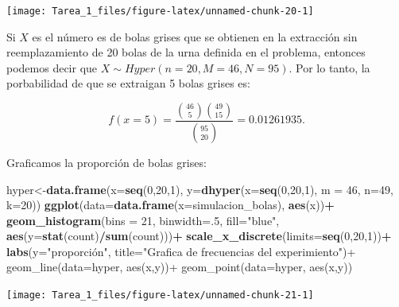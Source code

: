\documentclass[11pt,]{article}
\newenvironment{Shaded}{\begin{snugshade}}{\end{snugshade}}
\newcommand{\DataTypeTok}[1]{\textcolor[rgb]{0.13,0.29,0.53}{#1}}
\newcommand{\DecValTok}[1]{\textcolor[rgb]{0.00,0.00,0.81}{#1}}
\newcommand{\KeywordTok}[1]{\textcolor[rgb]{0.13,0.29,0.53}{\textbf{#1}}}
\newcommand{\NormalTok}[1]{#1}
\newcommand{\OperatorTok}[1]{\textcolor[rgb]{0.81,0.36,0.00}{\textbf{#1}}}
\newcommand{\StringTok}[1]{\textcolor[rgb]{0.31,0.60,0.02}{#1}}
\begin{document}
\begin{center}\texttt{[image: Tarea\_1\_files/figure-latex/unnamed-chunk-20-1]} \end{center}

Si \(X\) es el número es de bolas grises que se obtienen en la
extracción sin reemplazamiento de 20 bolas de la urna definida en el
problema, entonces podemos decir que \(X\sim Hyper(n=20, M=46, N=95)\).
Por lo tanto, la porbabilidad de que se extraigan 5 bolas grises es:

\[f(x=5)=\frac{{46 \choose 5}{49 \choose 15}}{{95 \choose 20}}=0.01261935. \]

Graficamos la proporción de bolas grises:

\begin{Shaded}
\begin{Highlighting}[]
\NormalTok{hyper<-}\KeywordTok{data.frame}\NormalTok{(}\DataTypeTok{x=}\KeywordTok{seq}\NormalTok{(}\DecValTok{0}\NormalTok{,}\DecValTok{20}\NormalTok{,}\DecValTok{1}\NormalTok{), }\DataTypeTok{y=}\KeywordTok{dhyper}\NormalTok{(}\DataTypeTok{x=}\KeywordTok{seq}\NormalTok{(}\DecValTok{0}\NormalTok{,}\DecValTok{20}\NormalTok{,}\DecValTok{1}\NormalTok{), }\DataTypeTok{m =} \DecValTok{46}\NormalTok{, }\DataTypeTok{n=}\DecValTok{49}\NormalTok{, }\DataTypeTok{k=}\DecValTok{20}\NormalTok{))}
\KeywordTok{ggplot}\NormalTok{(}\DataTypeTok{data=}\KeywordTok{data.frame}\NormalTok{(}\DataTypeTok{x=}\NormalTok{simulacion_bolas), }\KeywordTok{aes}\NormalTok{(x))}\OperatorTok{+}
\StringTok{  }\KeywordTok{geom_histogram}\NormalTok{(}\DataTypeTok{bins =} \DecValTok{21}\NormalTok{, }\DataTypeTok{binwidth=}\NormalTok{.}\DecValTok{5}\NormalTok{, }\DataTypeTok{fill=}\StringTok{"blue"}\NormalTok{, }\KeywordTok{aes}\NormalTok{(}\DataTypeTok{y=}\KeywordTok{stat}\NormalTok{(count)}\OperatorTok{/}\KeywordTok{sum}\NormalTok{(count)))}\OperatorTok{+}
\StringTok{  }\KeywordTok{scale_x_discrete}\NormalTok{(}\DataTypeTok{limits=}\KeywordTok{seq}\NormalTok{(}\DecValTok{0}\NormalTok{,}\DecValTok{20}\NormalTok{,}\DecValTok{1}\NormalTok{))}\OperatorTok{+}
\StringTok{  }\KeywordTok{labs}\NormalTok{(}\DataTypeTok{y=}\StringTok{"proporción", title="}\NormalTok{Grafica de frecuencias del experimiento}\StringTok{")+}
\StringTok{  geom_line(data=hyper, aes(x,y))+}
\StringTok{  geom_point(data=hyper, aes(x,y))}
\end{Highlighting}
\end{Shaded}

\begin{center}\texttt{[image: Tarea\_1\_files/figure-latex/unnamed-chunk-21-1]} \end{center}
\end{document}
